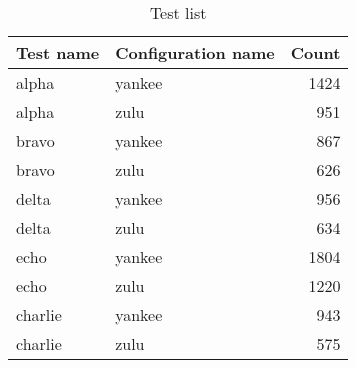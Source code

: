 \begin{table}[bt]
\caption{Test list}
\label{tab:test-overview}
\begin{center}
\begin{tabular}{llr}
\toprule
Test name & Configuration name & Count \\
\midrule
alpha & yankee & 1424 \\
alpha & zulu & 951 \\
bravo & yankee & 867 \\
bravo & zulu & 626 \\
delta & yankee & 956 \\
delta & zulu & 634 \\
echo & yankee & 1804 \\
echo & zulu & 1220 \\
charlie & yankee & 943 \\
charlie & zulu & 575 \\
\bottomrule
\end{tabular}
\end{center}
\end{table}

